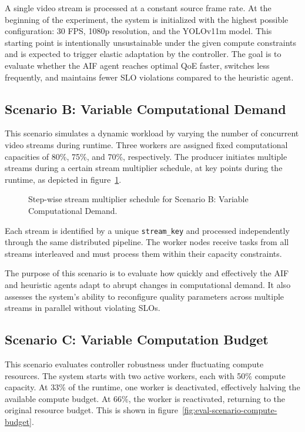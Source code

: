 A single video stream is processed at a constant source frame rate. At the beginning of the experiment, the system is initialized with the highest possible configuration: 30 FPS, 1080p resolution, and the YOLOv11m model. This starting point is intentionally unsustainable under the given compute constraints and is expected to trigger elastic adaptation by the controller. The goal is to evaluate whether the AIF agent reaches optimal QoE faster, switches less frequently, and maintains fewer SLO violations compared to the heuristic agent.

\subsection{Scenario B: Variable Computational Demand}
\label{sec:evaluation-variable-demand}

This scenario simulates a dynamic workload by varying the number of concurrent video streams during runtime. Three workers are assigned fixed computational capacities of 80\%, 75\%, and 70\%, respectively. The producer initiates multiple streams during a certain stream multiplier schedule, at key points during the runtime, as depicted in figure~\ref{fig:eval-scenario-stream-schedule-comp-demand}.

\begin{figure}[htbp]
\centering

\caption{Step-wise stream multiplier schedule for Scenario B: Variable Computational Demand.}
\label{fig:eval-scenario-stream-schedule-comp-demand}
\end{figure}


Each stream is identified by a unique \texttt{stream\_key} and processed independently through the same distributed pipeline. The worker nodes receive tasks from all streams interleaved and must process them within their capacity constraints.

The purpose of this scenario is to evaluate how quickly and effectively the AIF and heuristic agents adapt to abrupt changes in computational demand. It also assesses the system’s ability to reconfigure quality parameters across multiple streams in parallel without violating SLOs.

\subsection{Scenario C: Variable Computation Budget}
\label{sec:evaluation-variable-budget}

This scenario evaluates controller robustness under fluctuating compute resources. The system starts with two active workers, each with 50\% compute capacity. At 33\% of the runtime, one worker is deactivated, effectively halving the available compute budget. At 66\%, the worker is reactivated, returning to the original resource budget. This is shown in figure~\ref{fig:eval-scenario-compute-budget}.

